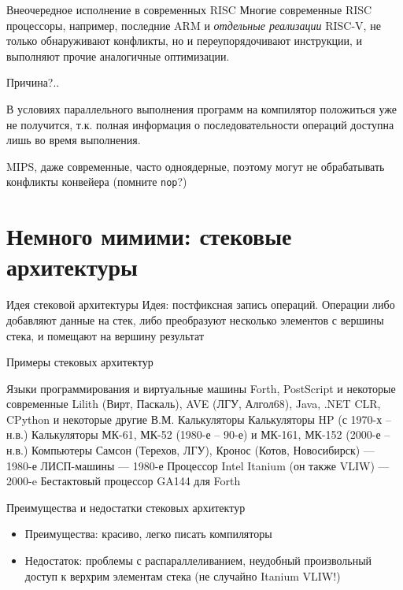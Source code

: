 \documentclass[xetex,aspectratio=43]{beamer}
\begin{document}
\begin{frame}{Внеочередное исполнение в современных RISC}
    Многие современные RISC процессоры, например, последние ARM и \emph{отдельные реализации} RISC-V, не только     обнаруживают конфликты, но и переупорядочивают инструкции, и выполняют
    прочие аналогичные оптимизации.

    Причина?..

    \pause

    В условиях параллельного выполнения программ на компилятор положиться
    уже не получится, т.к. полная информация о последовательности операций
    доступна лишь во время выполнения.

    MIPS, даже современные, часто одноядерные, поэтому могут не обрабатывать конфликты конвейера (помните \texttt{nop}?)
\end{frame}

\section{Немного мимими: стековые архитектуры}

\begin{frame}{Идея стековой архитектуры}
    Идея: постфиксная запись операций. Операции либо добавляют данные на стек, либо преобразуют несколько элементов с вершины стека, и помещают на вершину результат
\end{frame}

\begin{frame}{Примеры стековых архитектур}
    \begin{outline}[itemize]
        \1 Языки программирования и виртуальные машины
            \2 Forth, PostScript и некоторые современные
            \2 Lilith (Вирт, Паскаль), AVE (ЛГУ, Алгол68), Java, .NET CLR, CPython и некоторые другие В.М.
        \1 Калькуляторы
            \2 Калькуляторы HP (с 1970-х – н.в.)
            \2 Калькуляторы МК-61, МК-52 (1980-е – 90-е) и МК-161, МК-152 (2000-е – н.в.)
        \1 Компьютеры
            \2 Самсон (Терехов, ЛГУ), Кронос (Котов, Новосибирск) — 1980-е
            \2 ЛИСП-машины — 1980-е
            \2 Процессор Intel Itanium (он также VLIW) — 2000-e
            \2 Бестактовый процессор GA144 для Forth
    \end{outline}
\end{frame}

\begin{frame}{Преимущества и недостатки стековых архитектур}
    \begin{itemize}
        \item Преимущества: красиво, легко писать компиляторы
        \item Недостаток: проблемы с распараллеливанием, неудобный произвольный доступ к верхрим элементам стека (не случайно Itanium VLIW!)
    \end{itemize}
\end{frame}
\end{document}
